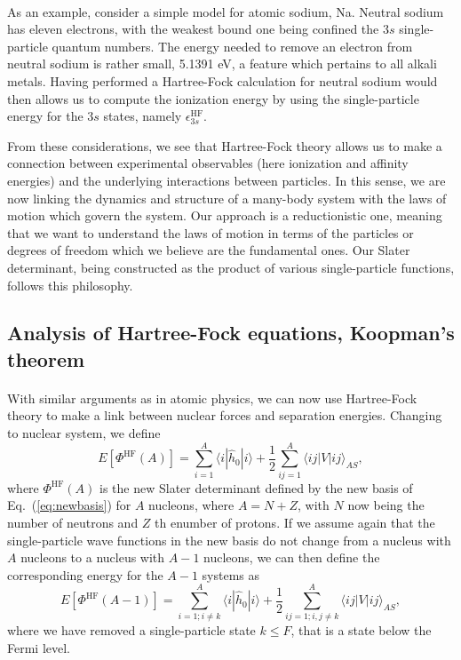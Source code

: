 \documentclass[%
twoside,                 %
final,                   %
10pt]{article}
\begin{document}
\paragraph{}
As an example, consider a simple model for atomic sodium, Na. Neutral sodium has eleven electrons, 
with the weakest bound one being confined the $3s$ single-particle quantum numbers. The energy needed to remove an electron from neutral sodium is rather small, 5.1391 eV, a feature which pertains to all alkali metals.
Having performed a  Hartree-Fock calculation for neutral sodium would then allows us to compute the
ionization energy by using the single-particle energy for the $3s$ states, namely $\epsilon_{3s}^{\mathrm{HF}}$. 

From these considerations, we see that Hartree-Fock theory allows us to make a connection between experimental 
observables (here ionization and affinity energies) and the underlying interactions between particles.  
In this sense, we are now linking the dynamics and structure of a many-body system with the laws of motion which govern the system. Our approach is a reductionistic one, meaning that we want to understand the laws of motion 
in terms of the particles or degrees of freedom which we believe are the fundamental ones. Our Slater determinant, being constructed as the product of various single-particle functions, follows this philosophy.



\subsection*{Analysis of Hartree-Fock equations, Koopman's theorem}

\paragraph{}
With similar arguments as in atomic physics, we can now use Hartree-Fock theory to make a link
between nuclear forces and separation energies. Changing to nuclear system, we define
\[
  E[\Phi^{\mathrm{HF}}(A)] 
  = \sum_{i=1}^A \langle i | \hat{h}_0 | i \rangle +
  \frac{1}{2}\sum_{ij=1}^A\langle ij|V|ij\rangle_{AS},
\]
where $\Phi^{\mathrm{HF}}(A)$ is the new Slater determinant defined by the new basis of Eq.~(\ref{eq:newbasis})
for $A$ nucleons, where $A=N+Z$, with $N$ now being the number of neutrons and $Z$ th enumber of protons.  If we assume again that the single-particle wave functions in the new basis do not change from a nucleus with $A$ nucleons to a nucleus with $A-1$  nucleons, we can then define the corresponding energy for the $A-1$ systems as 
\[
  E[\Phi^{\mathrm{HF}}(A-1)] 
  = \sum_{i=1; i\ne k}^A \langle i | \hat{h}_0 | i \rangle +
  \frac{1}{2}\sum_{ij=1;i,j\ne k}^A\langle ij|V|ij\rangle_{AS},
\]
where we have removed a single-particle state $k\le F$, that is a state below the Fermi level.
\end{document}
